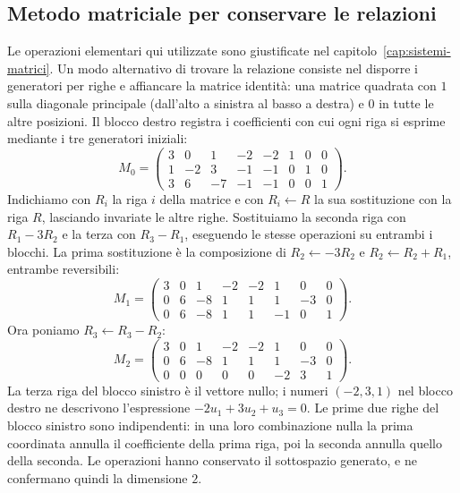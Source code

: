\subsection{Metodo matriciale per conservare le relazioni}
\begin{svolgimento}
Le operazioni elementari qui utilizzate sono giustificate nel capitolo~\ref{cap:sistemi-matrici}. Un modo alternativo di trovare la relazione consiste nel disporre i generatori per righe e affiancare la matrice identità: una matrice quadrata con $1$ sulla diagonale principale (dall’alto a sinistra al basso a destra) e $0$ in tutte le altre posizioni. Il blocco destro registra i coefficienti con cui ogni riga si esprime mediante i tre generatori iniziali:
\[
  M_0=\left(\begin{array}{rrrrr|rrr}
    3&0&1&-2&-2&1&0&0\\
    1&-2&3&-1&-1&0&1&0\\
    3&6&-7&-1&-1&0&0&1
  \end{array}\right).
\]
Indichiamo con $R_i$ la riga $i$ della matrice e con $R_i\leftarrow R$ la sua sostituzione con la riga $R$, lasciando invariate le altre righe. Sostituiamo la seconda riga con $R_1-3R_2$ e la terza con $R_3-R_1$, eseguendo le stesse operazioni su entrambi i blocchi. La prima sostituzione è la composizione di $R_2\leftarrow-3R_2$ e $R_2\leftarrow R_2+R_1$, entrambe reversibili:
\[
  M_1=\left(\begin{array}{rrrrr|rrr}
    3&0&1&-2&-2&1&0&0\\
    0&6&-8&1&1&1&-3&0\\
    0&6&-8&1&1&-1&0&1
  \end{array}\right).
\]
Ora poniamo $R_3\leftarrow R_3-R_2$:
\[
  M_2=\left(\begin{array}{rrrrr|rrr}
    3&0&1&-2&-2&1&0&0\\
    0&6&-8&1&1&1&-3&0\\
    0&0&0&0&0&-2&3&1
  \end{array}\right).
\]
La terza riga del blocco sinistro è il vettore nullo; i numeri $(-2,3,1)$ nel blocco destro ne descrivono l'espressione $-2u_1+3u_2+u_3=0$. Le prime due righe del blocco sinistro sono indipendenti: in una loro combinazione nulla la prima coordinata annulla il coefficiente della prima riga, poi la seconda annulla quello della seconda. Le operazioni hanno conservato il sottospazio generato, e ne confermano quindi la dimensione $2$.
\end{svolgimento}

